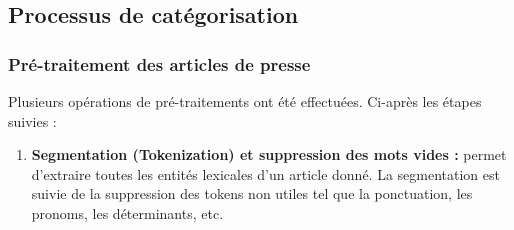     \subsection{Processus de catégorisation}
        \subsubsection{Pré-traitement des articles de presse}
         Plusieurs opérations de pré-traitements ont été effectuées. Ci-après les étapes suivies :
        \begin{enumerate}
            \item{\textbf{Segmentation (Tokenization) et suppression des mots vides :} }permet d'extraire toutes les entités lexicales d'un article donné. La segmentation est suivie de la suppression des tokens non utiles tel que la ponctuation, les pronoms, les déterminants, etc.\\ 
                          
                
                                       
                                                          
                
                                                               
                
                
                
                
                
                

\end{enumerate}
